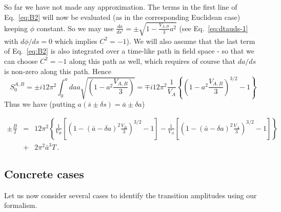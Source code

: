 \documentclass[a4paper,11pt]{article}
\numberwithin{equation}{section}
\begin{document}
So far we have not made any approximation. The terms in the first
line of Eq.~\eqref{eq:B2} will now be evaluated (as in the corresponding
Euclidean case) keeping $\phi$ constant. So we may use $\frac{da}{ds'}=\pm\sqrt{1-\frac{V_{A,B}}{3}a^{2}}$
(see Eq.~\eqref{eq:dtauds-1} with $d\phi/ds=0$ which implies $C^{2}=-1$).
We will also assume that the last term of Eq.~\eqref{eq:B2} is also integrated over a time-like path in field space - so that we can choose $C^{2}=-1$ along this path as well, which requires of course that $da/ds$ is non-zero along this path. Hence
\begin{equation}
S_{0}^{A,B}=\pm i12\pi^{2}\int_{0}^{a}daa\sqrt{\left(1-a^{2}\frac{V_{A,B}}{3}\right)}=\mp i12\pi^{2}\frac{1}{V_{A}}\left\{ \left(1-a^{2}\frac{V_{A,B}}{3}\right)^{3/2}-1\right\} \label{eq:SA2}
\end{equation}
Thus we have (putting $a(\bar{s}\pm\delta s)=\bar{a}\pm\delta a$)


\begin{eqnarray}
\pm \frac{B}{2} & = & 12\pi^{2}\left\{ \frac{1}{V_{B}}\left[\left(1-\left(\bar{a}-\delta a\right)^{2}\frac{V_{B}}{3}\right)^{3/2}-1\right]-\frac{1}{V_{A}}\left[\left(1-\left(\bar{a}-\delta a\right)^{2}\frac{V_{A}}{3}\right)^{3/2}-1\right]\right\} \quad \nonumber \\
\quad  & + & 2\pi^{2}\bar{a}^{3}T\,.
\end{eqnarray}



\subsection{Concrete cases}
\label{sec:ThinWallApproximation}

Let us now consider several cases to identify the transition amplitudes using our formalism.
\end{document}
